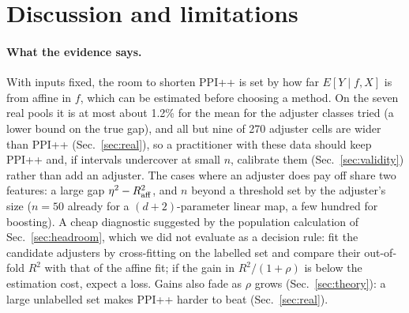 \section{Discussion and limitations}
\label{sec:discussion}
\paragraph{What the evidence says.}
With inputs fixed, the room to shorten PPI++ is set by how far $E[Y\mid f,X]$ is from affine in $f$, which can be estimated before choosing a method. On the seven real pools it is at most about 1.2\% for the mean for the adjuster classes tried (a lower bound on the true gap), and all but nine of 270 adjuster cells are wider than PPI++ (Sec.~\ref{sec:real}),
so a practitioner with these data should keep PPI++ and, if intervals undercover at small $n$, calibrate them (Sec.~\ref{sec:validity}) rather than add an adjuster. The cases where an adjuster does pay off share two features: a large gap $\eta^2-R^2_{\rm aff}$, and $n$ beyond a threshold set by the adjuster's size ($n=50$ already for a $(d{+}2)$-parameter linear map, a few hundred for boosting).
A cheap diagnostic suggested by the population calculation of Sec.~\ref{sec:headroom}, which we did not evaluate as a decision rule: fit the candidate adjusters by cross-fitting on the labelled set and compare their out-of-fold $R^2$ with that of the affine fit; if the gain in $R^2/(1+\rho)$ is below the estimation cost, expect a loss.
Gains also fade as $\rho$ grows (Sec.~\ref{sec:theory}): a large unlabelled set makes PPI++ harder to beat (Sec.~\ref{sec:real}).

